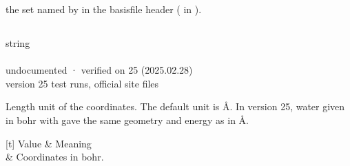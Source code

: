 \documentclass[letterpaper,10pt,english,openany,oneside]{sphinxmanual}
\begin{document}
\sphinxAtStartPar
{} the set named by  in the basis\sphinxhyphen{}file header ( in ).

\sphinxAtStartPar
{}

\begin{sphinxVerbatim}[commandchars=\\\{\}]
\end{sphinxVerbatim}

\sphinxAtStartPar
{} {\hyperref[\detokenize{reference/control:control-basis}]{}}


\subsection{}
\label{\detokenize{reference/molecule:unit}}\label{\detokenize{reference/molecule:molecule-unit}}
\ignorespaces 
\sphinxAtStartPar
{} string\\
 \\
 undocumented · verified on 25 (2025.02.28)\\
 version 25 test runs, official site files

\sphinxAtStartPar
Length unit of the coordinates. The default unit is Å. In version 25, water given in bohr with  gave the same geometry and energy as in Å.


\begin{savenotes}\sphinxattablestart
\sphinxthistablewithglobalstyle
\sphinxthistablewithnovlinesstyle
\centering
\begin{tabulary}{\linewidth}[t]{}
\sphinxtoprule
\sphinxstyletheadfamily 
\sphinxAtStartPar
Value
&\sphinxstyletheadfamily 
\sphinxAtStartPar
Meaning
\\
\sphinxmidrule
\sphinxtableatstartofbodyhook
\sphinxAtStartPar
{}
&
\sphinxAtStartPar
Coordinates in bohr.
\\
\sphinxbottomrule
\end{tabulary}
\sphinxtableafterendhook\par
\sphinxattableend\end{savenotes}
\end{document}
